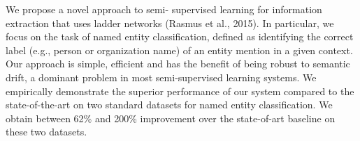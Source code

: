 We propose a novel approach to semi- supervised learning for information extraction that uses ladder networks (Rasmus et al., 2015). In particular, we focus on the task of named entity classification, defined as identifying the correct label (e.g., person or organization name) of an entity mention in a given context. Our approach is simple, efficient and has the benefit of being robust to semantic drift, a dominant problem in most semi-supervised learning systems. We empirically demonstrate the superior performance of our system compared to the state-of-the-art on two standard datasets for named entity classification. We obtain between 62\% and 200\% improvement over the state-of-art baseline on these two datasets.

